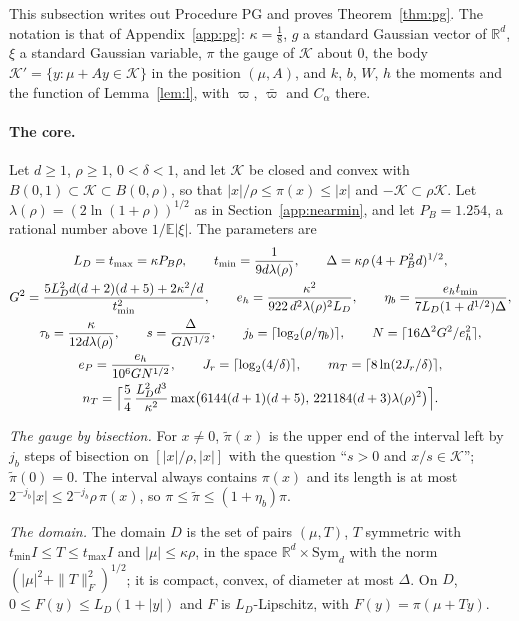 \documentclass[11pt]{amsart}
\theoremstyle{definition}
\numberwithin{equation}{section}
\newcommand{\R}{\mathbb{R}}
\newcommand{\E}{\mathbb{E}}
\newcommand{\cK}{\mathcal{K}}
\begin{document}
This subsection writes out Procedure PG and proves Theorem~\ref{thm:pg}. The notation is that of Appendix~\ref{app:pg}: $\kappa=\frac18$, $g$ a standard Gaussian vector of $\R^d$, $\xi$ a standard Gaussian variable, $\pi$ the gauge of $\cK$ about $0$, the body $\cK'=\{y:\mu+Ay\in\cK\}$ in the position $(\mu,A)$, and $k$, $b$, $W$, $h$ the moments and the function of Lemma~\ref{lem:l}, with $\varpi$, $\bar\varpi$ and $C_\alpha$ there.

\paragraph{The core.} Let $d\ge1$, $\rho\ge1$, $0<\delta<1$, and let $\cK$ be closed and convex with $B(0,1)\subset\cK\subset B(0,\rho)$, so that $|x|/\rho\le\pi(x)\le|x|$ and $-\cK\subset\rho\cK$. Let $\lambda(\rho)=(2\ln(1+\rho))^{1/2}$ as in Section~\ref{app:nearmin}, and let $P_B=1.254$, a rational number above $1/\E|\xi|$. The parameters are
\begin{gather*}
L_D=t_{\max}=\kappa P_B\rho,\qquad t_{\min}=\frac1{9d\lambda(\rho)},\qquad\Delta=\kappa\rho\,(4+P_B^2d)^{1/2},\\
G^2=\frac{5L_D^2d(d+2)(d+5)+2\kappa^2/d}{t_{\min}^2},\qquad e_h=\frac{\kappa^2}{922\,d^2\lambda(\rho)^2L_D},\qquad\eta_b=\frac{e_ht_{\min}}{7L_D(1+d^{1/2})\Delta},\\
\tau_b=\frac\kappa{12d\lambda(\rho)},\qquad s=\frac\Delta{GN^{1/2}},\qquad j_b=\lceil\log_2(\rho/\eta_b)\rceil,\qquad N=\lceil16\Delta^2G^2/e_h^2\rceil,\\
e_P=\frac{e_h}{10^6GN^{1/2}},\qquad J_r=\lceil\log_2(4/\delta)\rceil,\qquad m_T=\lceil8\ln(2J_r/\delta)\rceil,\\
n_T=\Bigl\lceil\frac54\,\frac{L_D^2d^3}{\kappa^2}\max\bigl(6144(d+1)(d+5),\,221184(d+3)\lambda(\rho)^2\bigr)\Bigr\rceil.
\end{gather*}

\emph{The gauge by bisection.} For $x\ne0$, $\tilde\pi(x)$ is the upper end of the interval left by $j_b$ steps of bisection on $[|x|/\rho,|x|]$ with the question ``$s>0$ and $x/s\in\cK$''; $\tilde\pi(0)=0$. The interval always contains $\pi(x)$ and its length is at most $2^{-j_b}|x|\le2^{-j_b}\rho\,\pi(x)$, so $\pi\le\tilde\pi\le(1+\eta_b)\pi$.

\emph{The domain.} The domain $D$ is the set of pairs $(\mu,T)$, $T$ symmetric with $t_{\min}I\le T\le t_{\max}I$ and $|\mu|\le\kappa\rho$, in the space $\R^d\times\mathrm{Sym}_d$ with the norm $(|\mu|^2+\|T\|_F^2)^{1/2}$; it is compact, convex, of diameter at most $\Delta$. On $D$, $0\le F(y)\le L_D(1+|y|)$ and $F$ is $L_D$-Lipschitz, with $F(y)=\pi(\mu+Ty)$.
\end{document}
